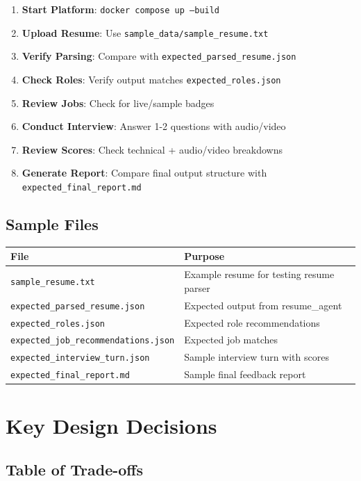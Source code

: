 \documentclass[11pt]{article}
\begin{document}
\begin{enumerate}
  \item \textbf{Start Platform}: \texttt{docker compose up --build}
  \item \textbf{Upload Resume}: Use \texttt{sample\_data/sample\_resume.txt}
  \item \textbf{Verify Parsing}: Compare with \texttt{expected\_parsed\_resume.json}
  \item \textbf{Check Roles}: Verify output matches \texttt{expected\_roles.json}
  \item \textbf{Review Jobs}: Check for live/sample badges
  \item \textbf{Conduct Interview}: Answer 1-2 questions with audio/video
  \item \textbf{Review Scores}: Check technical + audio/video breakdowns
  \item \textbf{Generate Report}: Compare final output structure with \texttt{expected\_final\_report.md}
\end{enumerate}

\subsection{Sample Files}

\begin{tabular}{|l|p{8cm}|}
\hline
\textbf{File} & \textbf{Purpose} \\
\hline
\texttt{sample\_resume.txt} & Example resume for testing resume parser \\
\hline
\texttt{expected\_parsed\_resume.json} & Expected output from resume\_agent \\
\hline
\texttt{expected\_roles.json} & Expected role recommendations \\
\hline
\texttt{expected\_job\_recommendations.json} & Expected job matches \\
\hline
\texttt{expected\_interview\_turn.json} & Sample interview turn with scores \\
\hline
\texttt{expected\_final\_report.md} & Sample final feedback report \\
\hline
\end{tabular}

\newpage

\section{Key Design Decisions}

\subsection{Table of Trade-offs}
\end{document}
